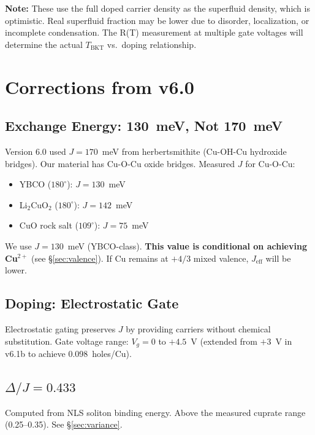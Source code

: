 \documentclass[11pt, a4paper]{article}
\begin{document}
\textbf{Note:} These use the full doped carrier density as the
superfluid density, which is optimistic. Real superfluid
fraction may be lower due to disorder, localization, or
incomplete condensation. The R(T) measurement at multiple gate
voltages will determine the actual $T_{\text{BKT}}$ vs.\
doping relationship.

\section{Corrections from v6.0}

\subsection{Exchange Energy: 130~meV, Not 170~meV}

Version 6.0 used $J = 170$~meV from herbertsmithite
(Cu-OH-Cu hydroxide bridges). Our material has Cu-O-Cu oxide
bridges. Measured $J$ for Cu-O-Cu:
\begin{itemize}[nosep]
  \item YBCO ($180^\circ$): $J = 130$~meV
  \item Li$_2$CuO$_2$ ($180^\circ$): $J = 142$~meV
  \item CuO rock salt ($109^\circ$): $J = 75$~meV
\end{itemize}

We use $J = 130$~meV (YBCO-class). \textbf{This value is
conditional on achieving Cu$^{2+}$} (see \S\ref{sec:valence}).
If Cu remains at $+4/3$ mixed valence, $J_{\text{eff}}$ will
be lower.

\subsection{Doping: Electrostatic Gate}

Electrostatic gating preserves $J$ by providing carriers
without chemical substitution. Gate voltage range:
$V_g = 0$ to $+4.5$~V (extended from $+3$~V in v6.1b to
achieve 0.098~holes/Cu).

\subsection{$\Delta/J = 0.433$}

Computed from NLS soliton binding energy. Above the measured
cuprate range (0.25--0.35). See \S\ref{sec:variance}.

\end{document}
